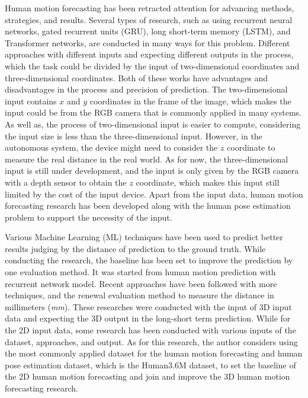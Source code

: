 Human motion forecasting has been retracted attention for advancing methods, strategies, and results. Several types of research, such as using recurrent neural networks, gated recurrent units (GRU), long short-term memory (LSTM), and Transformer networks, are conducted in many ways for this problem. Different approaches with different inputs and expecting different outputs in the process, which the task could be divided by the input of two-dimensional coordinates and three-dimensional coordinates. Both of these works have advantages and disadvantages in the process and precision of prediction. The two-dimensional input contains $x$ and $y$ coordinates in the frame of the image, which makes the input could be from the RGB camera that is commonly applied in many systems. As well as, the process of two-dimensional input is easier to compute, considering the input size is less than the three-dimensional input. However, in the autonomous system, the device might need to consider the $z$ coordinate to measure the real distance in the real world. As for now, the three-dimensional input is still under development, and the input is only given by the RGB camera with a depth sensor to obtain the $z$ coordinate, which makes this input still limited by the cost of the input device. Apart from the input data, human motion forecasting research has been developed along with the human pose estimation problem to support the necessity of the input. 

Various Machine Learning (ML) techniques have been used to predict better results judging by the distance of prediction to the ground truth. While conducting the research, the baseline has been set to improve the prediction by one evaluation method. It was started from human motion prediction with recurrent network model\cite{fragkiadaki2015recurrent, jain2016, chiu2019}. Recent approaches have been followed with more techniques, and the renewal evaluation method to measure the distance in millimeters (\textit{mm})\cite{Sofianos2021, motionmixer2022}. These researches were conducted with the input of 3D input data and expecting the 3D output in the long-short term prediction. While for the 2D input data, some research has been conducted with various inputs of the dataset, approaches, and output\cite{mathieu2015, posetrack}. As for this research, the author considers using the most commonly applied dataset for the human motion forecasting and human pose estimation dataset, which is the Human3.6M dataset, to set the baseline of the 2D human motion forecasting and join and improve the 3D human motion forecasting research. 

